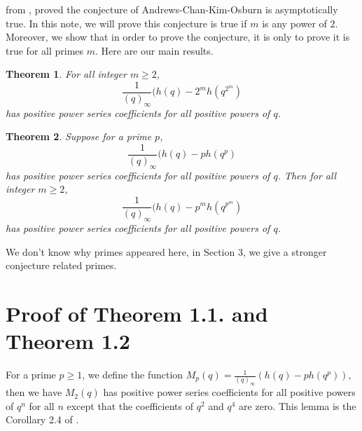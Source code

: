 \documentclass[11pt,reqno]{amsart}
\newtheorem{theorem}{Theorem}[section]
\theoremstyle{definition}
\numberwithin{equation}{section}
\begin{document}
from \cite{bm2},  proved the conjecture of Andrews-Chan-Kim-Osburn is asymptotically true. In this note, we will prove this conjecture is true if $m$ is any power of $2$. Moreover, we show that in order to prove the conjecture, it is only to prove it is true for all primes $m$.  Here are our main results.
\begin{theorem}\label{main}
For all integer $m\geq 2$,
$$
\frac{1}{(q)_{\infty}}(h(q)-2^{m}h(q^{2^{m}})
$$
has positive power series coefficients for all positive powers of $q$.
\end{theorem}

\begin{theorem}\label{second main}
Suppose for a prime $p$, 
$$
\frac{1}{(q)_{\infty}}(h(q)-ph(q^{p})
$$
has positive power series coefficients for all positive powers of $q$.
Then for all integer $m\geq 2$,
$$
\frac{1}{(q)_{\infty}}(h(q)-p^{m}h(q^{p^{m}})
$$
has positive power series coefficients for all positive powers of $q$.
\end{theorem}
We don't know why primes appeared here, in Section 3, we give a stronger conjecture related primes.





\section{ Proof of Theorem 1.1. and Theorem 1.2}
\noindent For a prime $p\geq 1$, we define the function
$
M_{p}(q)=\frac{1}{(q)_{\infty}}(h(q)-ph(q^p)),
$
\noindent then we have 
$M_{2}(q)$ has positive power series coefficients for all positive powers of $q^{n}$ for all $n$ except that the coefficients of $q^{2}$ and $q^{4}$ are zero. This lemma is the Corollary 2.4 of \cite{acko}.
\end{document}
